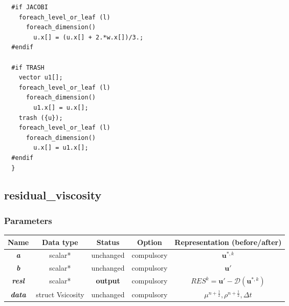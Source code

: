 \documentclass[a4paper]{article}
\newcommand{\func}[1]{\textbf{\textcolor{function}{#1}}}
\newcommand{\para}[1]{\textbf{\emph{\textcolor{para}{#1}}}}
\begin{document}
\begin{multicols}{2}
  \columnbreak
  \begin{verbatim}
  #if JACOBI
    foreach_level_or_leaf (l)
      foreach_dimension()
        u.x[] = (u.x[] + 2.*w.x[])/3.;
  #endif
  
  #if TRASH
    vector u1[];
    foreach_level_or_leaf (l)
      foreach_dimension()
        u1.x[] = u.x[];
    trash ({u});
    foreach_level_or_leaf (l)
      foreach_dimension()
        u.x[] = u1.x[];
  #endif
  }
  \end{verbatim}
\end{multicols}

\subsection{\func{residual\_viscosity}}\label{sec:resi}
\subsubsection{Parameters}
\begin{center}
  \begin{tabular}{|c|c|c|c|c|}
    \hline
    Name & Data type & Status & Option & Representation (before/after)\\[0.5ex]
    \hline\hline
    \para{a} & scalar* & unchanged & compulsory & $ \mathbf{u}^{*,k}$\\
    \hline
    \para{b} & scalar* & unchanged & compulsory & $ \mathbf{u}'$\\
    \hline
    \rowcolor{output}\para{resl} & scalar* & \textbf{output} & compulsory & $RES^k = \mathbf{u}'- \mathscr{D}( \mathbf{u}^{*,k})$\\
    \hline
    \para{data} & struct Vsicosity & unchanged & compulsory & $\mu^ {n+\frac{1}{2}}, \rho^{n+\frac{1}{2}}, \Delta t$ \\
    \hline
  \end{tabular}
\end{center}
\end{document}
